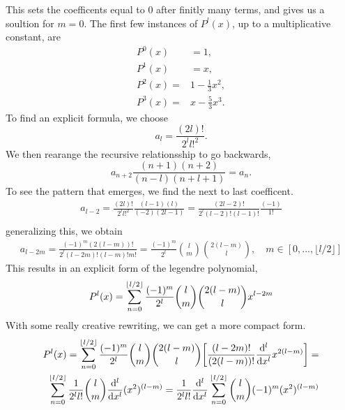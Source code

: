 \documentclass{article}
\begin{document}
    This sets the coefficents equal to \(0\) after finitly many terms, and gives us a soultion for \(m = 0\). The first few instances of \(P^l(x)\), up to a multiplicative constant, are
    \begin{align*}
        P^0(x) &= 1,\\
        P^1(x) &= x,\\
        P^2(x) = & 1 - \frac{1}{3}x^2, \\
        P^3(x) = & x - \frac{5}{3}x^3.
    \end{align*}
    To find an explicit formula, we choose 
    \begin{equation*}
        a_l = \frac{(2l)!}{2^l l!^2}.
    \end{equation*}
    We then rearange the recursive relationsship to go backwards,
    \begin{equation*}
        a_{n + 2}\frac{(n + 1)(n + 2)}{(n - l)(n + l + 1)} = a_{n}.
    \end{equation*}
    To see the pattern that emerges, we find the next to last coefficent.
    \begin{align*}
        a_{l - 2} = \frac{(2l)!}{2^l l!^2} \frac{(l - 1)(l)}{(-2)(2l -1)} = \frac{(2l - 2)!}{2^{l} (l - 2)!(l-1)!} \frac{(-1)}{1!}\\
    \end{align*}
    generalizing this, we obtain
    \begin{align*}
        a_{l - 2m} = \frac{(-1)^m(2(l - m))!}{2^{l} (l - 2m)!(l - m)! m!} = \frac{(-1)^m}{2^l}\binom{l}{m} \binom{2(l - m)}{l}, \quad
        m \in [0, ..., \lfloor l/2 \rfloor] 
    \end{align*}
    This results in an explicit form of the legendre polynomial,
    \begin{equation*}
        P^l(x) = \sum_{n = 0}^{\left\lfloor l/2 \right\rfloor} \frac{(-1)^m}{2^l}\binom{l}{m} \binom{2(l - m)}{l} x^{l - 2m}
    \end{equation*}
    With some really creative rewriting, we can get a more compact form.
    \begin{align*}
        P^l(x) = \sum_{n = 0}^{\left\lfloor l/2 \right\rfloor} \frac{(-1)^m}{2^l}\binom{l}{m} \binom{2(l - m)}{l} \bigg[\frac{(l - 2m)!}{(2(l - m))!}\frac{\mathrm{d}^l}{\mathrm{d}x^l}x^{2(l - m)}\bigg] = \\ \sum_{n = 0}^{\left\lfloor l/2 \right\rfloor} \frac{1}{2^ll!}\binom{l}{m} \frac{\mathrm{d}^l}{\mathrm{d}x^l}(x^2)^{(l - m)} = \frac{1}{2^ll!} \frac{\mathrm{d}^l}{\mathrm{d}x^l} \sum_{n = 0}^{\left\lfloor l/2 \right\rfloor} \binom{l}{m}(-1)^m(x^2)^{(l - m)}  
    \end{align*}
\end{document}
